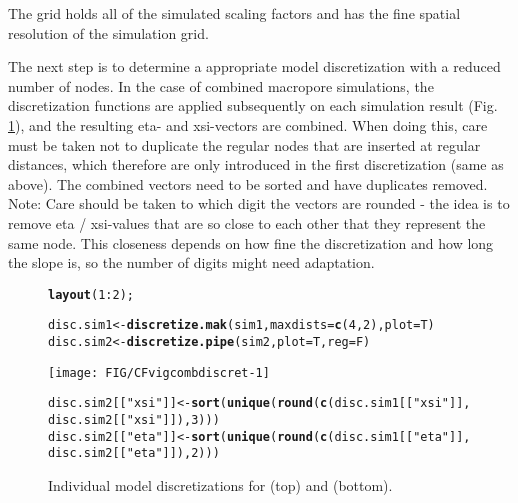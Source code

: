 \documentclass[article,nojss]{jss}\usepackage[]{graphicx}\usepackage[]{xcolor}
\makeatletter
\def\maxwidth{ %
  \ifdim\Gin@nat@width>\linewidth
    \linewidth
  \else
    \Gin@nat@width
  \fi
}
\newcommand{\hlnum}[1]{\textcolor[rgb]{0.686,0.059,0.569}{#1}}%
\newcommand{\hlsng}[1]{\textcolor[rgb]{0.192,0.494,0.8}{#1}}%
\newcommand{\hlopt}[1]{\textcolor[rgb]{0,0,0}{#1}}%
\newcommand{\hldef}[1]{\textcolor[rgb]{0.345,0.345,0.345}{#1}}%
\newcommand{\hlkwb}[1]{\textcolor[rgb]{0.69,0.353,0.396}{#1}}%
\newcommand{\hlkwc}[1]{\textcolor[rgb]{0.333,0.667,0.333}{#1}}%
\newcommand{\hlkwd}[1]{\textcolor[rgb]{0.737,0.353,0.396}{\textbf{#1}}}%
\newenvironment{kframe}{%
 \def\at@end@of@kframe{}%
 \ifinner\ifhmode%
  \def\at@end@of@kframe{\end{minipage}}%
  \begin{minipage}{\columnwidth}%
 \fi\fi%
 \def\FrameCommand##1{\hskip\@totalleftmargin \hskip-\fboxsep
 \colorbox{shadecolor}{##1}\hskip-\fboxsep
     \hskip-\linewidth \hskip-\@totalleftmargin \hskip\columnwidth}%
 \MakeFramed {\advance\hsize-\width
   \@totalleftmargin\z@ \linewidth\hsize
   \@setminipage}}%
 {\par\unskip\endMakeFramed%
 \at@end@of@kframe}
\newenvironment{knitrout}{}{} %
\makeatother
\begin{document}
The grid  holds all of the simulated scaling factors and has the fine spatial 
resolution of the simulation grid. 

The next step is to determine a appropriate model discretization with
a reduced number of nodes. In the case of combined macropore simulations, the discretization 
functions are applied subsequently on each simulation result (Fig. \ref{fig:inddiscret}), and the resulting eta- and xsi-vectors
are combined. When doing this, care must be taken not to duplicate 
the regular nodes that are inserted at regular distances, which therefore are only introduced 
in the first discretization  (same as above). The combined vectors need to be sorted and have duplicates removed. Note: Care should be taken to which digit the vectors are rounded - the idea is to remove eta / xsi-values that are so close to each other that they represent the same node. This closeness depends on how fine the discretization and how long the slope is, so the number of digits might need adaptation.

\begin{figure}[h]
\begin{center}
\begin{knitrout}
\color{fgcolor}\begin{kframe}
\begin{alltt}
 \hlkwd{layout}\hldef{(}\hlnum{1}\hlopt{:}\hlnum{2}\hldef{);}

 \hldef{disc.sim1} \hlkwb{<-} \hlkwd{discretize.mak}\hldef{(sim1,} \hlkwc{maxdists} \hldef{=} \hlkwd{c}\hldef{(}\hlnum{4}\hldef{,}\hlnum{2}\hldef{),} \hlkwc{plot}\hldef{=T)}
 \hldef{disc.sim2} \hlkwb{<-} \hlkwd{discretize.pipe}\hldef{(sim2,} \hlkwc{plot}\hldef{=T,} \hlkwc{reg}\hldef{=F)}
\end{alltt}
\end{kframe}
\texttt{[image: FIG/CFvigcombdiscret-1]} 
\begin{kframe}\begin{alltt}
 \hldef{disc.sim2[[}\hlsng{"xsi"}\hldef{]]} \hlkwb{<-} \hlkwd{sort}\hldef{(}\hlkwd{unique}\hldef{(}\hlkwd{round}\hldef{(}\hlkwd{c}\hldef{(disc.sim1[[}\hlsng{"xsi"}\hldef{]],}
                                           \hldef{disc.sim2[[}\hlsng{"xsi"}\hldef{]]),} \hlnum{3}\hldef{)))}
 \hldef{disc.sim2[[}\hlsng{"eta"}\hldef{]]} \hlkwb{<-} \hlkwd{sort}\hldef{(}\hlkwd{unique}\hldef{(}\hlkwd{round}\hldef{(}\hlkwd{c}\hldef{(disc.sim1[[}\hlsng{"eta"}\hldef{]],}
                                           \hldef{disc.sim2[[}\hlsng{"eta"}\hldef{]]),}\hlnum{2}\hldef{)) )}
\end{alltt}
\end{kframe}
\end{knitrout}
\caption{\label{fig:inddiscret} Individual model discretizations for  (top) and  (bottom).}
\end{center}
\end{figure}
\end{document}
